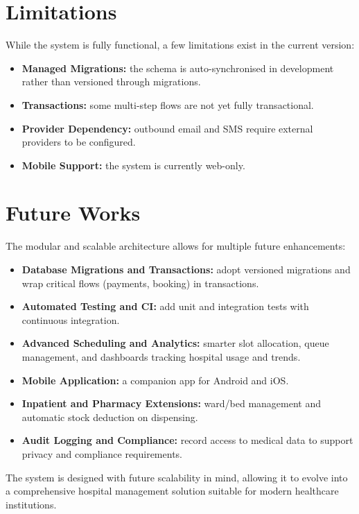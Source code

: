\documentclass[12pt,a4paper]{report}
\begin{document}
\section{Limitations}
While the system is fully functional, a few limitations exist in the current version:
\begin{itemize}[leftmargin=1.4em]
  \item \textbf{Managed Migrations:} the schema is auto-synchronised in development
        rather than versioned through migrations.
  \item \textbf{Transactions:} some multi-step flows are not yet fully transactional.
  \item \textbf{Provider Dependency:} outbound email and SMS require external providers
        to be configured.
  \item \textbf{Mobile Support:} the system is currently web-only.
\end{itemize}

\section{Future Works}
The modular and scalable architecture allows for multiple future enhancements:
\begin{itemize}[leftmargin=1.4em]
  \item \textbf{Database Migrations and Transactions:} adopt versioned migrations and
        wrap critical flows (payments, booking) in transactions.
  \item \textbf{Automated Testing and CI:} add unit and integration tests with
        continuous integration.
  \item \textbf{Advanced Scheduling and Analytics:} smarter slot allocation, queue
        management, and dashboards tracking hospital usage and trends.
  \item \textbf{Mobile Application:} a companion app for Android and iOS.
  \item \textbf{Inpatient and Pharmacy Extensions:} ward/bed management and automatic
        stock deduction on dispensing.
  \item \textbf{Audit Logging and Compliance:} record access to medical data to support
        privacy and compliance requirements.
\end{itemize}
The system is designed with future scalability in mind, allowing it to evolve into a
comprehensive hospital management solution suitable for modern healthcare institutions.
\end{document}
